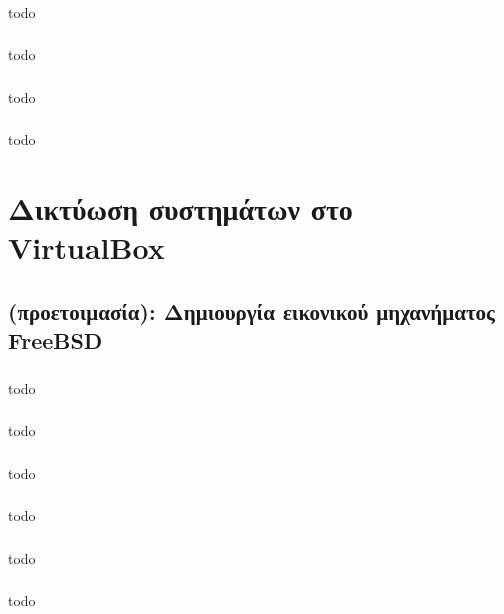 \documentclass[a4paper, 12pt]{article}
\begin{document}
		\subsubsection{}
			todo

		\subsubsection{}
			todo

		\subsubsection{}
			todo

		\subsubsection{}
			todo

\section{Δικτύωση συστημάτων στο VirtualBox}

	\subsection{(προετοιμασία): Δημιουργία εικονικού μηχανήματος FreeBSD}

		\subsubsection{}
			todo

		\subsubsection{}
			todo

		\subsubsection{}
			todo

		\subsubsection{}
			todo

		\subsubsection{}
			todo

		\subsubsection{}
			todo
\end{document}
